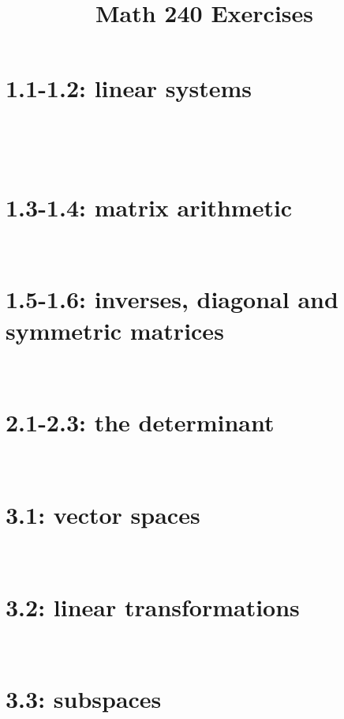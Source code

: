 \documentclass[11pt]{amsart}
\title{Math 240 Exercises}
\theoremstyle{definition}
\theoremstyle{named}
\numberwithin{myalgctr}{section}
\begin{document}
\maketitle
\tableofcontents
\section*{1.1-1.2: linear systems}\label{S:linear}
\ \\
\setcounter{exercises@solutionnumber}{1}


\setcounter{exercises@solutionnumber}{1}
\ \\
\section*{1.3-1.4: matrix arithmetic}\label{S:matrix}


\setcounter{exercises@solutionnumber}{1}
\ \\
\section*{1.5-1.6: inverses, diagonal and symmetric matrices}\label{S:inverse}


\setcounter{exercises@solutionnumber}{1}
\ \\
\section*{2.1-2.3: the determinant}\label{S:det}


\setcounter{exercises@solutionnumber}{1}
\ \\
\section*{3.1: vector spaces}


\setcounter{exercises@solutionnumber}{1}
\ \\
\section*{3.2: linear transformations}


\setcounter{exercises@solutionnumber}{1}
\ \\
\section*{3.3: subspaces}

\end{document}
